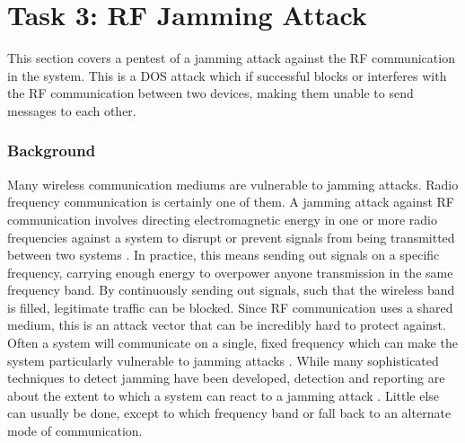 \section{Task 3: RF Jamming Attack}\label{ch:pentesting:rf-jamming}
This section covers a pentest of a jamming attack against the RF communication in the system. This is a \gls{DOS} attack which if successful blocks or interferes with the RF communication between two devices, making them unable to send messages to each other.

\subsubsection{Background}
Many wireless communication mediums are vulnerable to jamming attacks. Radio frequency communication is certainly one of them. A jamming attack against RF communication involves directing electromagnetic energy in one or more radio frequencies against a system to disrupt or prevent signals from being transmitted between two systems \cite{adamy2004ew}. In practice, this means sending out signals on a specific frequency, carrying enough energy to overpower anyone transmission in the same frequency band. By continuously sending out signals, such that the wireless band is filled, legitimate traffic can be blocked. Since RF communication uses a shared medium, this is an attack vector that can be incredibly hard to protect against. Often a system will communicate on a single, fixed frequency which can make the system particularly vulnerable to jamming attacks \cite{jamming-feasibility}. While many sophisticated techniques to detect jamming have been developed, detection and reporting are about the extent to which a system can react to a jamming attack \cite{optimal-jamming-defense}. Little else can usually be done, except to which frequency band or fall back to an alternate mode of communication.

